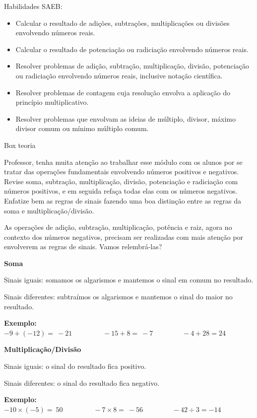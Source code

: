 Habilidades SAEB:

\begin{itemize}
\item
  Calcular o resultado de adições, subtrações, multiplicações ou
  divisões envolvendo números reais.
\item
  Calcular o resultado de potenciação ou radiciação envolvendo números
  reais.
\item
  Resolver problemas de adição, subtração, multiplicação, divisão,
  potenciação ou radiciação envolvendo números reais, inclusive notação
  científica.
\item
  Resolver problemas de contagem cuja resolução envolva a aplicação do
  princípio multiplicativo.
\item
  Resolver problemas que envolvam as ideias de múltiplo, divisor, máximo
  divisor comum ou mínimo múltiplo comum.
\end{itemize}

Box teoria

Professor, tenha muita atenção ao trabalhar esse módulo com os alunos
por se tratar das operações fundamentais envolvendo números positivos e
negativos. Revise soma, subtração, multiplicação, divisão, potenciação e
radiciação com números positivos, e em seguida refaça todas elas com os
números negativos. Enfatize bem as regras de sinais fazendo uma boa
distinção entre as regras da soma e multiplicação/divisão.

As operações de adição, subtração, multiplicação, potência e raiz, agora
no contexto dos números negativos, precisam ser realizadas com mais
atenção por envolverem as regras de sinais. Vamos relembrá-las?

\textbf{Soma}

Sinais iguais: somamos os algarismos e mantemos o sinal em comum no
resultado.

Sinais diferentes: subtraímos os algarismos e mantemos o sinal do maior
no resultado.

\textbf{Exemplo:}
\(- 9 + \left( - 12 \right) = \  - 21\ \ \ \ \ \ \ \ \ \ \ \ \ \ \ \ \ \ \ \  - 15 + 8 = \  - 7\ \ \ \ \ \ \ \ \ \ \ \ \ \ \ \ \ \ \  - 4 + 28 = 24\)

\textbf{Multiplicação/Divisão}

Sinais iguais: o sinal do resultado fica positivo.

Sinais diferentes: o sinal do resultado fica negativo.

\textbf{Exemplo:}
\(- 10 \times \left( - 5 \right) = \ 50\ \ \ \ \ \ \ \ \ \ \ \ \ \ \ \ \ \ \ \  - 7 \times 8 = \  - 56\ \ \ \ \ \ \ \ \ \ \ \ \ \ \ \ \ \ \  - 42 \div 3 = - 14\)


